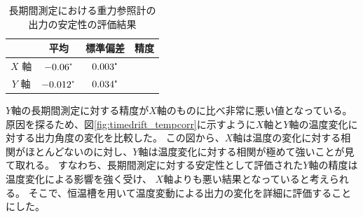 \documentclass[../../main.tex]{subfiles}
\begin{document}
\begin{table}[H]
    \centering
    \caption{長期間測定における重力参照計の出力の安定性の評価結果}
    \begin{tabular}{cccc} \hline
        & 平均 & 標準偏差 & 精度 \\ \hline\hline
        $X$ 軸 & $-0.06\tcdegree$ & $0.003\tcdegree$ \\
        $Y$ 軸 & $-0.012\tcdegree$ & $0.034\tcdegree$
    \end{tabular}
    \label{tab:timedrift_result}
\end{table}

$Y$軸の長期間測定に対する精度が$X$軸のものに比べ非常に悪い値となっている。
原因を探るため、図\ref{fig:timedrift_tempcorr}に示すように$X$軸と$Y$軸の温度変化に対する出力角度の変化を比較した。
この図から、$X$軸は温度の変化に対する相関がほとんどないのに対し、$Y$軸は温度変化に対する相関が極めて強いことが見て取れる。
すなわち、長期間測定に対する安定性として評価された$Y$軸の精度は温度変化による影響を強く受け、
$X$軸よりも悪い結果となっていると考えられる。
そこで、恒温槽を用いて温度変動による出力の変化を詳細に評価することにした。
\end{document}
